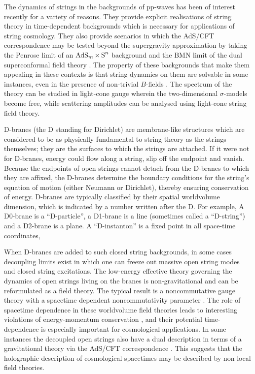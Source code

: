 The dynamics of strings in the backgrounds of pp-waves has been of interest
recently for a variety of reasons. They provide explicit realisations of string
theory in time-dependent backgrounds which is necessary for applications of
string cosmology. They also provide scenarios in which the AdS/CFT
correspondence may be tested beyond the supergravity approximation by taking the
Penrose limit of an $\operatorname{AdS}_m\times\operatorname{S}^n$ background \cite{BFP1} and the BMN limit
of the dual superconformal field theory \cite{BMN1}. The property of these
backgrounds that make them appealing in these contexts is that string dynamics
on them are solvable in some instances, even in the presence of non-trivial
$B$-fields \cite{BMN1,BOLPT1,Met1,PRT1,RT1}. The spectrum of the theory can be
studied in light-cone gauge wherein the two-dimensional $\sigma$-models become
free, while scattering amplitudes can be analysed using light-cone string field
theory.

D-branes (the D standing for Dirichlet) are membrane-like structures which are
considered to be as physically fundamental to string theory as the strings
themselves; they are the surfaces to which the strings are attached. If it were
not for D-branes, energy could flow along a string, slip off the endpoint and
vanish. Because the endpoints of open strings cannot detach from the D-branes to
which they are affixed, the D-branes determine the boundary conditions for the
string's equation of motion (either Neumann or Dirichlet), thereby ensuring
conservation of energy. D-branes are typically classified by their spatial
worldvolume dimension, which is indicated by a number written after the D. For
example, A D0-brane is a ``D-particle'', a D1-brane is a line (sometimes called
a ``D-string'') and a D2-brane is a plane. A ``D-instanton'' is a fixed point in
all space-time coordinates,

When D-branes are added to such closed string backgrounds, in some cases
decoupling limits exist in which one can freeze out massive open string modes
and closed string excitations. The low-energy effective theory governing the
dynamics of open strings living on the branes is non-gravitational and can be
reformulated as a field theory. The typical result is a noncommutative gauge
theory with a spacetime dependent noncommutativity parameter
\cite{CLO1,DRRS1,DN1,HS1,HT1,LNR1}. The role of spacetime dependence in these
worldvolume field theories leads to interesting violations of energy-momentum
conservation \cite{BG1,RS1}, and their potential time-dependence is especially
important for cosmological applications. In some instances the decoupled open
strings also have a dual description in terms of a gravitational theory via the
AdS/CFT correspondence \cite{HS1}. This suggests that the holographic
description of cosmological spacetimes may be described by non-local field
theories.

